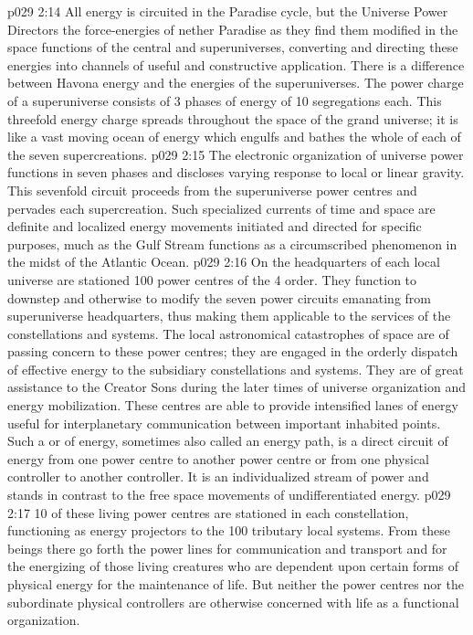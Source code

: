 \vs p029 2:14 All energy is circuited in the Paradise cycle, but the Universe Power Directors  the force\hyp{}energies of nether Paradise as they find them modified in the space functions of the central and superuniverses, converting and directing these energies into channels of useful and constructive application. There is a difference between Havona energy and the energies of the superuniverses. The power charge of a superuniverse consists of 3 phases of energy of 10 segregations each. This threefold energy charge spreads throughout the space of the grand universe; it is like a vast moving ocean of energy which engulfs and bathes the whole of each of the seven supercreations.
\vs p029 2:15 The electronic organization of universe power functions in seven phases and discloses varying response to local or linear gravity. This sevenfold circuit proceeds from the superuniverse power centres and pervades each supercreation. Such specialized currents of time and space are definite and localized energy movements initiated and directed for specific purposes, much as the Gulf Stream functions as a circumscribed phenomenon in the midst of the Atlantic Ocean.
\vs p029 2:16 \bibnobreakspace {} On the headquarters of each local universe are stationed 100 power centres of the 4 order. They function to downstep and otherwise to modify the seven power circuits emanating from superuniverse headquarters, thus making them applicable to the services of the constellations and systems. The local astronomical catastrophes of space are of passing concern to these power centres; they are engaged in the orderly dispatch of effective energy to the subsidiary constellations and systems. They are of great assistance to the Creator Sons during the later times of universe organization and energy mobilization. These centres are able to provide intensified lanes of energy useful for interplanetary communication between important inhabited points. Such a  or  of energy, sometimes also called an energy path, is a direct circuit of energy from one power centre to another power centre or from one physical controller to another controller. It is an individualized stream of power and stands in contrast to the free space movements of undifferentiated energy.
\vs p029 2:17 \bibnobreakspace {} 10 of these living power centres are stationed in each constellation, functioning as energy projectors to the 100 tributary local systems. From these beings there go forth the power lines for communication and transport and for the energizing of those living creatures who are dependent upon certain forms of physical energy for the maintenance of life. But neither the power centres nor the subordinate physical controllers are otherwise concerned with life as a functional organization.
